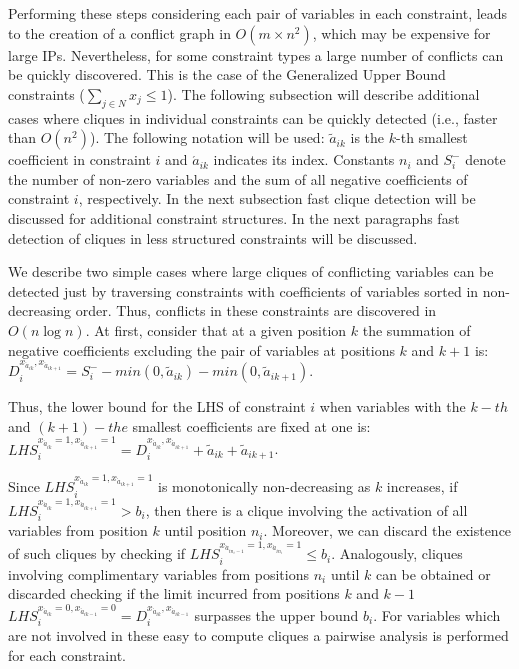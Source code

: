 \documentclass{endm}
\begin{document}
Performing these steps considering each pair of variables in each constraint, leads to the creation of a conflict graph in $O(m \times n^2)$, which may be expensive for large IPs.  Nevertheless, for some constraint types a large number of conflicts can be quickly discovered. This is the case of the Generalized Upper Bound constraints ($\sum_{j\in N}x_j \leq 1$). The following subsection will describe additional cases where cliques in individual constraints can be quickly detected (i.e., faster than $O(n^2)$). The following notation will be used: $\tilde{a}_{ik}$ is the $k$-th smallest coefficient in constraint $i$ and $\acute{a}_{ik}$ indicates its index. Constants $n_i$ and $S_i^-$ denote the number of non-zero variables and the sum of all negative coefficients of constraint $i$, respectively. In the next subsection fast clique detection will be discussed for additional constraint structures. In the next paragraphs fast detection of cliques in less structured constraints will be discussed.

We describe two simple cases where large cliques of conflicting variables can be detected just by traversing constraints with  coefficients of variables sorted in non-decreasing order. Thus, conflicts in these constraints are discovered in $O( n \log n)$. At first, consider that at a given position $k$ the summation of negative coefficients excluding the pair of variables at positions $k$ and $k+1$ is: $\displaystyle D_{i}^{x_{\acute{a}_{ik}}, x_{\acute{a}_{ik+1}}} = S_i^- - min(0, \tilde{a}_{ik}) - min(0, \tilde{a}_{ik+1})$.

\noindent Thus, the lower bound for the LHS of constraint $i$ when variables with the $k-th$ and $(k+1)-the$ smallest coefficients are fixed at one is: $\displaystyle LHS_{i}^{x_{\acute{a}_{ik}} = 1, x_{\acute{a}_{ik+1}} = 1} = D_{i}^{x_{\acute{a}_{ik}}, x_{\acute{a}_{ik+1}}} + \tilde{a}_{ik} + \tilde{a}_{ik+1}$.

Since $LHS_{i}^{x_{\acute{a}_{ik}} = 1, x_{\acute{a}_{ik+1}} = 1}$ is monotonically non-decreasing as $k$ increases, if $LHS_{i}^{x_{\acute{a}_{ik}} = 1, x_{\acute{a}_{ik+1}} = 1} > b_{i}$, then there is a clique involving the activation of all variables from position $k$ until position $n_i$. Moreover, we can discard the existence of such cliques by checking if $LHS_{i}^{x_{\acute{a}_{in_i-1}} = 1, x_{\acute{a}_{in_i}} = 1} \leq b_i$. Analogously, cliques involving complimentary variables from positions $n_i$ until $k$ can be obtained or discarded checking if the limit incurred from positions $k$ and $k-1$  $LHS_{i}^{x_{\acute{a}_{ik}} = 0, x_{\acute{a}_{ik-1}} = 0} = D_{i}^{x_{\acute{a}_{ik}}, x_{\acute{a}_{ik-1}}} $ surpasses the upper bound $b_i$. For variables which are not involved in these easy to compute cliques a pairwise analysis is performed for each constraint. 
\end{document}
